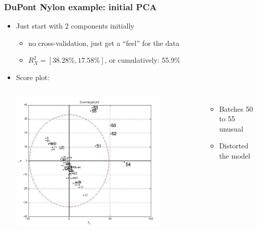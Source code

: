 \documentclass[handout, 12pt]{beamer}
\begin{document}
\begin{frame}\frametitle{DuPont Nylon example: initial PCA}
	\begin{itemize}

		\item	Just start with 2 components initially
		
				\begin{itemize}					
					\item	no cross-validation, just get a ``feel'' for the data
					\item	\( R^2_X = [38.28\%, 17.58\%]\), or cumulatively: 55.9\%
				\end{itemize}
		
		\item	Score plot:
				
				\begin{columns}
						\begin{center}
							\includegraphics[width=0.8\textwidth]{images/dupont/dupont-raw-score-plot.jpg}
						\end{center}
						
						\begin{itemize}
							\item	Batches 50 to 55 unusual
							
							\item	Distorted the model							
						\end{itemize}
				\end{columns}
	\end{itemize}
\end{frame}
\end{document}
